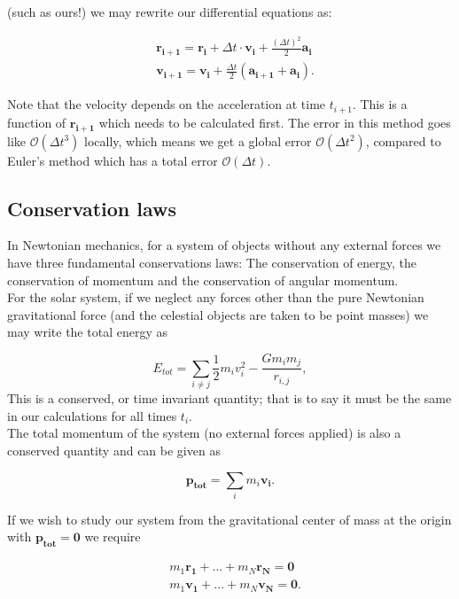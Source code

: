 \documentclass[%
 reprint,
 nobalance,
 amsmath,amssymb,
 aps,
]{revtex4-1}
\begin{document}
(such as ours!) we may rewrite our differential equations as:

\begin{equation}
\begin{split}
	&\bm{r_{i+1} = r_i} + \Delta t \cdot \bm{v_i} + \frac{(\Delta t)^{2}}{2} \bm{a_i} \\
	& \bm{v_{i+1} = v_i} + \frac{\Delta t}{2}(\bm{a_{i+1} + a_i}).
\end{split}
\end{equation}

Note that the velocity depends on the acceleration at time $t_{i+1}$. This is a function of $\bm{r_{i+1}}$ which needs to be calculated first. The error in this method goes like $\mathcal{O}(\Delta t^{3})$ locally, which means we get a global error $\mathcal{O}(\Delta t^{2})$, compared to Euler's method which has a total error $\mathcal{O}(\Delta t)$.

\subsection{\label{sec:Con}Conservation laws}
In Newtonian mechanics, for a system of objects without any external forces we have three fundamental conservations laws: The conservation of energy, the conservation of momentum and the conservation of angular momentum. \\
For the solar system, if we neglect any forces other than the pure Newtonian gravitational force (and the celestial objects are taken to be point masses) we may write the total energy as

\begin{equation}\label{eq:10}
	E_{tot} = \sum_{i \neq j}{\frac{1}{2}m_i v_{i}^{2} - \frac{Gm_i m_j}{r_{i,j}}},
\end{equation}
This is a conserved, or time invariant quantity; that is to say it must be the same in our calculations for all times $t_i$.\\
The total momentum of the system (no external forces applied) is also a conserved quantity and can be given as

\begin{equation}
	\bm{p_{tot}} = \sum_i{m_i\bm{v_i}}.
\end{equation}

If we wish to study our system from the gravitational center of mass at the origin with $\bm{p_{tot} = 0}$ we require

\begin{equation}
\begin{split}
	& m_1 \bm{r_1} + ... + m_N \bm{r_N} = \bm{0} \\
	& m_1 \bm{v_1} + ... + m_N \bm{v_N} = \bm{0}.
\end{split}
\end{equation}
\end{document}
